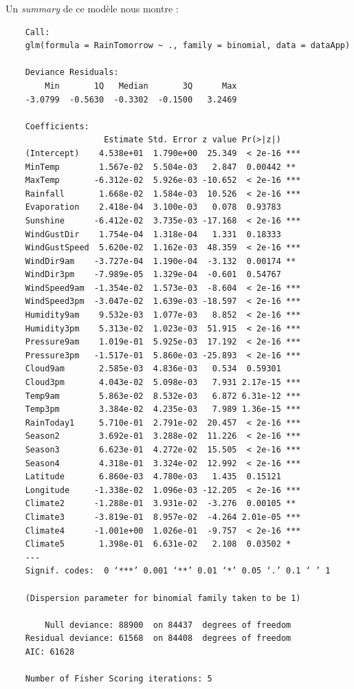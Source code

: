 \documentclass{article}
\begin{document}
Un \emph{summary} de ce modèle nous montre : 
\begin{verbatim}
    Call:
    glm(formula = RainTomorrow ~ ., family = binomial, data = dataApp)
    
    Deviance Residuals: 
        Min       1Q   Median       3Q      Max  
    -3.0799  -0.5630  -0.3302  -0.1500   3.2469  
    
    Coefficients:
                    Estimate Std. Error z value Pr(>|z|)    
    (Intercept)    4.538e+01  1.790e+00  25.349  < 2e-16 ***
    MinTemp        1.567e-02  5.504e-03   2.847  0.00442 ** 
    MaxTemp       -6.312e-02  5.926e-03 -10.652  < 2e-16 ***
    Rainfall       1.668e-02  1.584e-03  10.526  < 2e-16 ***
    Evaporation    2.418e-04  3.100e-03   0.078  0.93783    
    Sunshine      -6.412e-02  3.735e-03 -17.168  < 2e-16 ***
    WindGustDir    1.754e-04  1.318e-04   1.331  0.18333    
    WindGustSpeed  5.620e-02  1.162e-03  48.359  < 2e-16 ***
    WindDir9am    -3.727e-04  1.190e-04  -3.132  0.00174 ** 
    WindDir3pm    -7.989e-05  1.329e-04  -0.601  0.54767    
    WindSpeed9am  -1.354e-02  1.573e-03  -8.604  < 2e-16 ***
    WindSpeed3pm  -3.047e-02  1.639e-03 -18.597  < 2e-16 ***
    Humidity9am    9.532e-03  1.077e-03   8.852  < 2e-16 ***
    Humidity3pm    5.313e-02  1.023e-03  51.915  < 2e-16 ***
    Pressure9am    1.019e-01  5.925e-03  17.192  < 2e-16 ***
    Pressure3pm   -1.517e-01  5.860e-03 -25.893  < 2e-16 ***
    Cloud9am       2.585e-03  4.836e-03   0.534  0.59301    
    Cloud3pm       4.043e-02  5.098e-03   7.931 2.17e-15 ***
    Temp9am        5.863e-02  8.532e-03   6.872 6.31e-12 ***
    Temp3pm        3.384e-02  4.235e-03   7.989 1.36e-15 ***
    RainToday1     5.710e-01  2.791e-02  20.457  < 2e-16 ***
    Season2        3.692e-01  3.288e-02  11.226  < 2e-16 ***
    Season3        6.623e-01  4.272e-02  15.505  < 2e-16 ***
    Season4        4.318e-01  3.324e-02  12.992  < 2e-16 ***
    Latitude       6.860e-03  4.780e-03   1.435  0.15121    
    Longitude     -1.338e-02  1.096e-03 -12.205  < 2e-16 ***
    Climate2      -1.288e-01  3.931e-02  -3.276  0.00105 ** 
    Climate3      -3.819e-01  8.957e-02  -4.264 2.01e-05 ***
    Climate4      -1.001e+00  1.026e-01  -9.757  < 2e-16 ***
    Climate5       1.398e-01  6.631e-02   2.108  0.03502 *  
    ---
    Signif. codes:  0 ‘***’ 0.001 ‘**’ 0.01 ‘*’ 0.05 ‘.’ 0.1 ‘ ’ 1
    
    (Dispersion parameter for binomial family taken to be 1)
    
        Null deviance: 88900  on 84437  degrees of freedom
    Residual deviance: 61568  on 84408  degrees of freedom
    AIC: 61628
    
    Number of Fisher Scoring iterations: 5
\end{verbatim}
\end{document}
